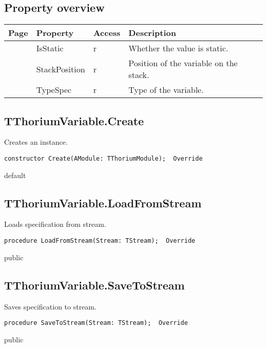 \subsection{Property overview}
\label{thoriumcorepkg:thorium:tthoriumvariable:properties}
\begin{tabularx}{\textwidth}{lllX}
Page & Property & Access & Description \\ \hline
\pageref{thoriumcorepkg:thorium:tthoriumvariable:isstatic} & IsStatic & r & Whether the value is static. \\
\pageref{thoriumcorepkg:thorium:tthoriumvariable:stackposition} & StackPosition & r & Position of the variable on the stack. \\
\pageref{thoriumcorepkg:thorium:tthoriumvariable:typespec} & TypeSpec & r & Type of the variable. \\
\hline
\end{tabularx}
\subsection{TThoriumVariable.Create}
\label{thoriumcorepkg:thorium:tthoriumvariable:create}
\begin{FPCList}
\Synopsis
Creates an instance.\Declaration 

\begin{verbatim}
constructor Create(AModule: TThoriumModule);  Override
\end{verbatim}
\Visibility
default
\end{FPCList}
\subsection{TThoriumVariable.LoadFromStream}
\label{thoriumcorepkg:thorium:tthoriumvariable:loadfromstream}
\begin{FPCList}
\Synopsis
Loads specification from stream.\Declaration 

\begin{verbatim}
procedure LoadFromStream(Stream: TStream);  Override
\end{verbatim}
\Visibility
public
\end{FPCList}
\subsection{TThoriumVariable.SaveToStream}
\label{thoriumcorepkg:thorium:tthoriumvariable:savetostream}
\begin{FPCList}
\Synopsis
Saves specification to stream.\Declaration 

\begin{verbatim}
procedure SaveToStream(Stream: TStream);  Override
\end{verbatim}
\Visibility
public
\end{FPCList}
